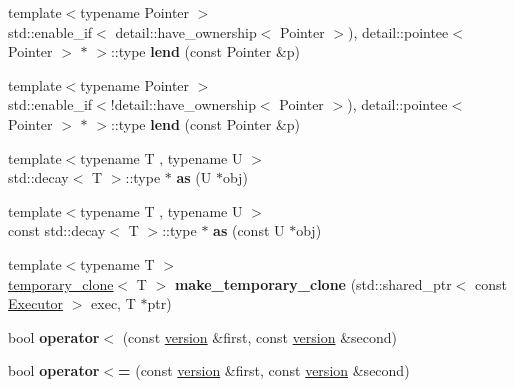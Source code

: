 \begin{DoxyCompactItemize}
\item 
\mbox{\label{namespacegko_aa8cb4876b72e5e1036ea9575443c439b}} 
{\footnotesize template$<$typename Pointer $>$ }\\std\+::enable\+\_\+if$<$ detail\+::have\+\_\+ownership$<$ Pointer $>$), detail\+::pointee$<$ Pointer $>$ $\ast$ $>$\+::type {\bfseries lend} (const Pointer \&p)
\item 
\mbox{\label{namespacegko_aa0c1deeb105cfb5a635b5f41cb5e8321}} 
{\footnotesize template$<$typename Pointer $>$ }\\std\+::enable\+\_\+if$<$!detail\+::have\+\_\+ownership$<$ Pointer $>$), detail\+::pointee$<$ Pointer $>$ $\ast$ $>$\+::type {\bfseries lend} (const Pointer \&p)
\item 
\mbox{\label{namespacegko_a73ce7e87aec389b5210630bb617b4baa}} 
{\footnotesize template$<$typename T , typename U $>$ }\\std\+::decay$<$ T $>$\+::type $\ast$ {\bfseries as} (U $\ast$obj)
\item 
\mbox{\label{namespacegko_a289e84ef5dea2f579dd12f27140a1470}} 
{\footnotesize template$<$typename T , typename U $>$ }\\const std\+::decay$<$ T $>$\+::type $\ast$ {\bfseries as} (const U $\ast$obj)
\item 
\mbox{\label{namespacegko_aa9c0782fb35cc18cb404716d9b6f2c0e}} 
{\footnotesize template$<$typename T $>$ }\\\hyperlink{classgko_1_1temporary__clone}{temporary\+\_\+clone}$<$ T $>$ {\bfseries make\+\_\+temporary\+\_\+clone} (std\+::shared\+\_\+ptr$<$ const \hyperlink{classgko_1_1Executor}{Executor} $>$ exec, T $\ast$ptr)
\item 
\mbox{\label{namespacegko_a70e5d651d3fc23e6ed48980efd2098d3}} 
bool {\bfseries operator$<$} (const \hyperlink{structgko_1_1version}{version} \&first, const \hyperlink{structgko_1_1version}{version} \&second)
\item 
\mbox{\label{namespacegko_aa3a749f76b73c3b0e161e2019ad12308}} 
bool {\bfseries operator$<$=} (const \hyperlink{structgko_1_1version}{version} \&first, const \hyperlink{structgko_1_1version}{version} \&second)

\end{DoxyCompactItemize}
